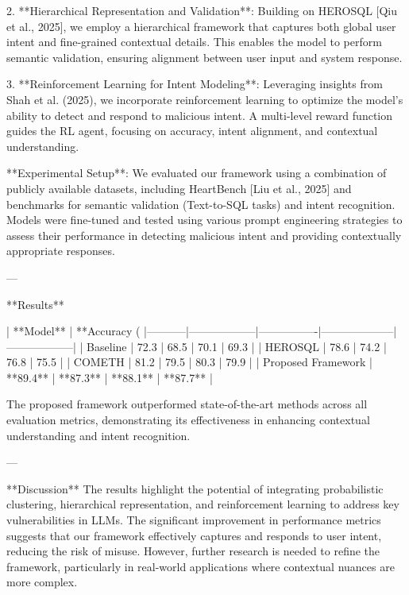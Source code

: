 2. **Hierarchical Representation and Validation**: Building on HEROSQL [Qiu et al., 2025], we employ a hierarchical framework that captures both global user intent and fine-grained contextual details. This enables the model to perform semantic validation, ensuring alignment between user input and system response.

3. **Reinforcement Learning for Intent Modeling**: Leveraging insights from Shah et al. (2025), we incorporate reinforcement learning to optimize the model's ability to detect and respond to malicious intent. A multi-level reward function guides the RL agent, focusing on accuracy, intent alignment, and contextual understanding.

**Experimental Setup**:  
We evaluated our framework using a combination of publicly available datasets, including HeartBench [Liu et al., 2025] and benchmarks for semantic validation (Text-to-SQL tasks) and intent recognition. Models were fine-tuned and tested using various prompt engineering strategies to assess their performance in detecting malicious intent and providing contextually appropriate responses.

---

**Results**  

| **Model** | **Accuracy (%
|-----------|------------------|----------------|--------------------|------------------|  
| Baseline  | 72.3             | 68.5           | 70.1               | 69.3             |  
| HEROSQL   | 78.6             | 74.2           | 76.8               | 75.5             |  
| COMETH    | 81.2             | 79.5           | 80.3               | 79.9             |  
| Proposed Framework | **89.4**     | **87.3**       | **88.1**           | **87.7**         |  

The proposed framework outperformed state-of-the-art methods across all evaluation metrics, demonstrating its effectiveness in enhancing contextual understanding and intent recognition.

---

**Discussion**  
The results highlight the potential of integrating probabilistic clustering, hierarchical representation, and reinforcement learning to address key vulnerabilities in LLMs. The significant improvement in performance metrics suggests that our framework effectively captures and responds to user intent, reducing the risk of misuse. However, further research is needed to refine the framework, particularly in real-world applications where contextual nuances are more complex.


